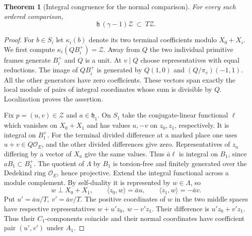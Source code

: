 \documentclass[a4paper,11pt]{article}
\newtheorem{theorem}[proposition]{Theorem}
\theoremstyle{definition}
\theoremstyle{remark}
\numberwithin{equation}{section}
\begin{document}
\begin{theorem}[Integral congruence for the normal comparison]
\label{thm:congruence227}
For every such ordered comparison,
\begin{equation}
       \mathfrak h\,(\gamma-1)\mathcal Z\ \subset\ T\mathcal Z .
       \label{eq:congruence227}
\end{equation}
\end{theorem}
\begin{proof}
For \(b\in S_i\) let \(\kappa_i(b)\) denote its two terminal
coefficients modulo \(X_0+X_i\). We first compute
\(\kappa_i(QB_i^+)=\mathcal Z\). Away from \(Q\) the two
individual primitive frames generate \(B_i^+\) and \(Q\)
is a unit. At \(v\mid Q\) choose representatives with equal
reductions. The image of \(QB_i^+\) is generated by \(Q(1,0)\)
and \((Q/\pi_v)(-1,1)\). All the other generators have zero
coefficients. These vectors span exactly the local module
of pairs of integral coordinates whose sum is divisible
by \(Q\). Localization proves the assertion.

Fix \(p=(u,v)\in\mathcal Z\) and \(a\in\mathfrak h_1\).
On \(S_1\) take the conjugate-linear functional \(\ell\)
which vanishes on \(X_0+X_1\) and has values \(u,-v\) on
\(z_0,z_1\), respectively. It is integral on \(B_1^+\).
For the terminal divided difference at a marked place one
uses \(u+v\in Q\mathcal O_E\), and the other divided
differences give zero. Representatives of \(z_a\) differing
by a vector of \(X_a\) give the same values. Thus
\(\bar a\ell\) is integral on \(B_1\), since \(aB_1\subset B_1^+\).
The quotient of \(\Lambda\) by \(B_1\) is torsion-free and
finitely generated over the Dedekind ring \(\mathcal O_E\),
hence projective. Extend the integral functional across a
module complement. By self-duality it is represented by
\(w\in\Lambda\), so
\[
 w\perp X_0+X_1,\qquad
 \langle z_0,w\rangle=\bar a u,\qquad
 \langle z_1,w\rangle=-\bar a v .
\]
Put \(u'=\bar a u/T,\ v'=\bar a v/T\). The positive
coordinates of \(w\) in the two middle spaces have respective
representatives \(w+u'z_0,\ w-v'z_1\). Their difference is
\(u'z_0+v'z_1\). Thus their \(C_1\)-components coincide
and their normal coordinates have coefficient pair
\((u',v')\) under \(A_1\).


\end{proof}
\end{document}

